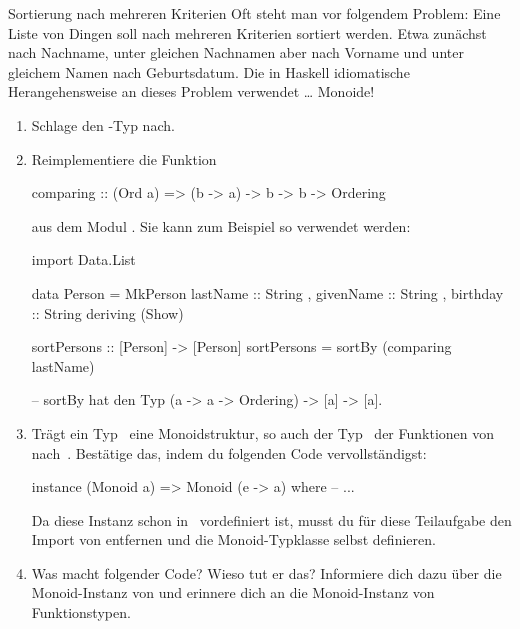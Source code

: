 \documentclass{uebblatt}
\begin{document}
\begin{aufgabe}{Sortierung nach mehreren Kriterien}
Oft steht man vor folgendem Problem: Eine Liste von Dingen soll nach mehreren
Kriterien sortiert werden. Etwa zunächst nach Nachname, unter gleichen
Nachnamen aber nach Vorname und unter gleichem Namen nach Geburtsdatum. Die
in Haskell idiomatische Herangehensweise an dieses Problem verwendet \ldots{}
Monoide!

\begin{enumerate}
\item Schlage den -Typ nach.
\item Reimplementiere die Funktion
\begin{haskellcode}
comparing :: (Ord a) => (b -> a) -> b -> b -> Ordering
\end{haskellcode}
aus dem Modul . Sie kann zum Beispiel so verwendet werden:
\begin{haskellcode}
import Data.List

data Person = MkPerson
    { lastName  :: String
    , givenName :: String
    , birthday  :: String
    }
    deriving (Show)

sortPersons :: [Person] -> [Person]
sortPersons = sortBy (comparing lastName)

-- sortBy hat den Typ (a -> a -> Ordering) -> [a] -> [a].
\end{haskellcode}
\item Trägt ein Typ~ eine Monoidstruktur, so auch der
Typ~ der Funktionen von~
nach~. Bestätige das, indem du folgenden Code vervollständigst:
\begin{haskellcode}
instance (Monoid a) => Monoid (e -> a) where
    -- ...
\end{haskellcode}
Da diese Instanz schon in~ vordefiniert ist, musst
du für diese Teilaufgabe den Import von entfernen
und die Monoid-Typklasse selbst definieren.
\item Was macht folgender Code? Wieso tut er das? Informiere dich dazu über
die Monoid-Instanz von  und erinnere dich an die
Monoid-Instanz von Funktionstypen.
\end{enumerate}
\end{aufgabe}
\end{document}
